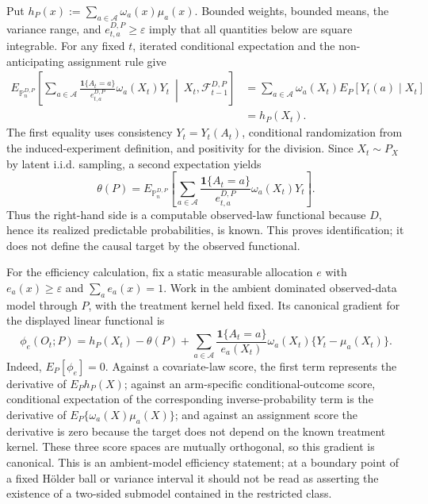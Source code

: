 Put \(h_P(x):=\sum_{a\in\mathcal A}\omega_a(x)\mu_a(x)\).  Bounded weights, bounded means, the variance range, and \(e_{t,a}^{D,P}\geq\varepsilon\) imply that all quantities below are square integrable.  For any fixed \(t\), iterated conditional expectation and the non-anticipating assignment rule give
\[
\begin{aligned}
E_{\mathbb P_n^{D,P}}\!\left[
 \sum_{a\in\mathcal A}
 \frac{\mathbf 1\{A_t=a\}}{e_{t,a}^{D,P}}
 \omega_a(X_t)Y_t
 \ \middle|\ X_t,\mathcal F_{t-1}^{D,P}
\right]
&=\sum_{a\in\mathcal A}\omega_a(X_t)
 E_P[Y_t(a)\mid X_t]\\
&=h_P(X_t).
\end{aligned}
\]
The first equality uses consistency \(Y_t=Y_t(A_t)\), conditional randomization from the induced-experiment definition, and positivity for the division.  Since \(X_t\sim P_X\) by latent i.i.d. sampling, a second expectation yields
\[
\theta(P)=E_{\mathbb P_n^{D,P}}\!\left[
 \sum_{a\in\mathcal A}
 \frac{\mathbf 1\{A_t=a\}}{e_{t,a}^{D,P}}
 \omega_a(X_t)Y_t
\right].
\]
Thus the right-hand side is a computable observed-law functional because \(D\), hence its realized predictable probabilities, is known.  This proves identification; it does not define the causal target by the observed functional.

For the efficiency calculation, fix a static measurable allocation \(e\) with \(e_a(x)\geq\varepsilon\) and \(\sum_a e_a(x)=1\).  Work in the ambient dominated observed-data model through \(P\), with the treatment kernel held fixed.  Its canonical gradient for the displayed linear functional is
\[
\phi_e(O_t;P)
=h_P(X_t)-\theta(P)
 +\sum_{a\in\mathcal A}
 \frac{\mathbf 1\{A_t=a\}}{e_a(X_t)}
 \omega_a(X_t)\{Y_t-\mu_a(X_t)\}.
\]
Indeed, \(E_P[\phi_e]=0\).  Against a covariate-law score, the first term represents the derivative of \(E_P h_P(X)\); against an arm-specific conditional-outcome score, conditional expectation of the corresponding inverse-probability term is the derivative of \(E_P\{\omega_a(X)\mu_a(X)\}\); and against an assignment score the derivative is zero because the target does not depend on the known treatment kernel.  These three score spaces are mutually orthogonal, so this gradient is canonical.  This is an ambient-model efficiency statement; at a boundary point of a fixed Hölder ball or variance interval it should not be read as asserting the existence of a two-sided submodel contained in the restricted class.

